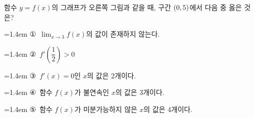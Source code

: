 \noindent\begin{minipage}[t]{0.58\linewidth}\vspace{0pt}\raggedright 함수 $y=f(x)$의 그래프가 오른쪽 그림과 같을 때, 구간 $(0{,}\mkern3mu\mathopen{}5)$에서 다음 중 옳은 것은?\end{minipage}\hfill\begin{minipage}[t]{0.4\linewidth}\vspace{0pt}\centering \resizebox{\ifdim\width>\linewidth\linewidth\else\width\fi}{!}{}\end{minipage}\par
\par\medskip\par\noindent\hangindent=1.4em {\small ①}\ $\displaystyle\lim_{x\to 3} f(x)$의 값이 존재하지 않는다.\par\noindent\hangindent=1.4em {\small ②}\ $f'\left(\dfrac{1}{2}\right)>0$\par\noindent\hangindent=1.4em {\small ③}\ $f'(x)=0$인 $x$의 값은 2개이다.\par\noindent\hangindent=1.4em {\small ④}\ 함수 $f(x)$가 불연속인 $x$의 값은 3개이다.\par\noindent\hangindent=1.4em {\small ⑤}\ 함수 $f(x)$가 미분가능하지 않은 $x$의 값은 4개이다.\par\medskip
